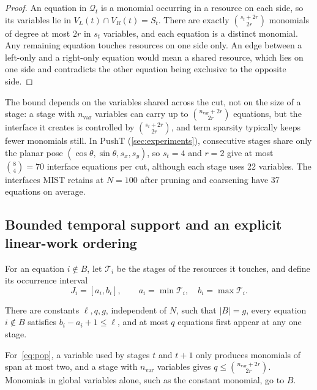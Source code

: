 \begin{proof}
An equation in $\mathcal Q_t$ is a monomial occurring in a resource on each side,
so its variables lie in $V_L(t)\cap V_R(t)=S_t$. There are exactly
$\binom{s_t+2r}{2r}$ monomials of degree at most $2r$ in $s_t$ variables, and each
equation is a distinct monomial. Any remaining equation touches resources on one
side only. An edge between a left-only and a right-only equation would mean a
shared resource, which lies on one side and contradicts the other equation being
exclusive to the opposite side.
\end{proof}

The bound depends on the variables shared across the cut, not on the size of a
stage: a stage with $n_{\mathrm{var}}$ variables can carry up to
$\binom{n_{\mathrm{var}}+2r}{2r}$ equations, but the interface it creates is
controlled by $\binom{s_t+2r}{2r}$, and term sparsity typically keeps fewer
monomials still. In PushT (\cref{sec:experiments}), consecutive stages share only
the planar pose $(\cos\theta,\sin\theta,s_x,s_y)$, so $s_t=4$ and $r=2$ give at
most $\binom{8}{4}=70$ interface equations per cut, although each stage uses 22
variables. The interfaces MIST retains at $N=100$ after pruning and coarsening
have 37 equations on average.

\subsection{Bounded temporal support and an explicit linear-work ordering}

For an equation $i\notin B$, let $\mathcal T_i$ be the stages of the resources it
touches, and define its occurrence interval
\begin{equation}\label{eq:interval}
J_i=[a_i,b_i],\qquad a_i=\min\mathcal T_i,\quad b_i=\max\mathcal T_i.
\end{equation}

\begin{assumption}\label{ass:support}
There are constants $\ell,q,g$, independent of $N$, such that $|B|=g$, every
equation $i\notin B$ satisfies $b_i-a_i+1\le\ell$, and at most $q$ equations first
appear at any one stage.
\end{assumption}

For~\eqref{eq:pop}, a variable used by stages $t$ and $t+1$ only produces
monomials of span at most two, and a stage with $n_{\mathrm{var}}$ variables gives
$q\le\binom{n_{\mathrm{var}}+2r}{2r}$. Monomials in global variables alone, such
as the constant monomial, go to $B$.

